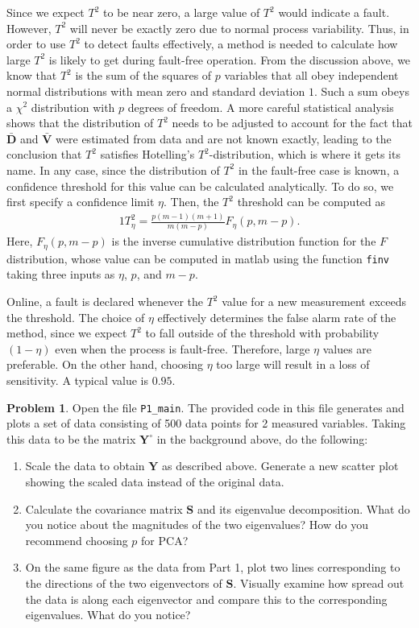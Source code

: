 \documentclass[14pt]{article}
\theoremstyle{definition}
\newtheorem{problem}{Problem}
\newcommand{\0}{\ensuremath{\mathbf{0}}}
\newcommand{\bs}[1]{\ensuremath{\mathbf{#1}}}
\begin{document}
Since we expect $T^2$ to be near zero, a large value of $T^2$ would indicate a fault. However, $T^2$ will never be exactly zero due to normal process variability. Thus, in order to use $T^2$ to detect faults effectively, a method is needed to calculate how large $T^2$ is likely to get during fault-free operation. From the discussion above, we know that $T^2$ is the sum of the squares of $p$ variables that all obey independent normal distributions with mean zero and standard deviation $1$. Such a sum obeys a $\chi^2$ distribution with $p$ degrees of freedom. A more careful statistical analysis shows that the distribution of $T^2$ needs to be adjusted to account for the fact that $\bar{\bs{D}}$ and $\bar{\bs{V}}$ were estimated from data and are not known exactly, leading to the conclusion that $T^2$ satisfies Hotelling's $T^2$-distribution, which is where it gets its name. In any case, since the distribution of $T^2$ in the fault-free case is known, a confidence threshold for this value can be calculated analytically. To do so, we first specify a confidence limit $\eta$. Then, the $T^2$ threshold can be computed as
\begin{alignat}{1}
T_{\eta}^2=\frac{p(m-1)(m+1)}{m(m-p)}F_\eta (p,m-p).
\end{alignat}
Here, $F_\eta (p,m-p)$ is the inverse cumulative distribution function for the $F$ distribution, whose value can be computed in matlab using the function \verb+finv+ taking three inputs as $\eta$, $p$, and $m-p$.

Online, a fault is declared whenever the $T^2$ value for a new measurement exceeds the threshold. The choice of $\eta$ effectively determines the false alarm rate of the method, since we expect $T^2$ to fall outside of the threshold with probability $(1-\eta)$ even when the process is fault-free. Therefore, large $\eta$ values are preferable. On the other hand, choosing $\eta$ too large will result in a loss of sensitivity. A typical value is $0.95$.

\begin{problem}
Open the file \verb+P1_main+. The provided code in this file generates and plots a set of data consisting of 500 data points for 2 measured variables. Taking this data to be the matrix $\bs{Y}^{\circ}$ in the background above, do the following:
\begin{enumerate}
    \item Scale the data to obtain $\bs{Y}$ as described above. Generate a new scatter plot showing the scaled data instead of the original data.
    \item Calculate the covariance matrix $\bs{S}$ and its eigenvalue decomposition. What do you notice about the magnitudes of the two eigenvalues? How do you recommend choosing $p$ for PCA?
    \item On the same figure as the data from Part 1, plot two lines corresponding to the directions of the two eigenvectors of $\bs{S}$. Visually examine how spread out the data is along each eigenvector and compare this to the corresponding eigenvalues. What do you notice?
\end{enumerate}
\end{problem}
\end{document}
